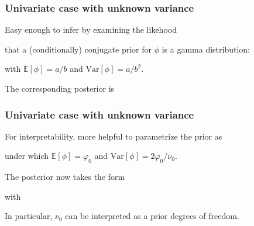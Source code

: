\documentclass[18pt]{beamer}
\newcommand{\defineTightItemizeSpacing}{%
	\setlength{\abovedisplayskip}{.25\baselineskip}%
	\setlength{\belowdisplayskip}{.25\baselineskip}%
}
\newenvironment{tightEquation*}{%
	\defineTightItemizeSpacing%
	\begin{equation*}
}{
	\end{equation*} \ignorespacesafterend
}
\newcommand{\given}{\thinnerspace | \thinnerspace}
\newcommand{\thinnerspace}{\mskip.5\thinmuskip}
\newcommand{\expectation}{\mathbb{E}}
\newcommand{\variance}{\mathrm{Var}}
\newcommand{\gammaDist}{\mathrm{Gamma}}
\newcommand{\density}{\pi}
\newcommand{\likelihood}{L}
\begin{document}
\begin{frame}
\frametitle{Univariate case with unknown variance}
\pause
Easy enough to infer by examining the likehood
\pause%
that a (conditionally) conjugate prior for $\phi$ is a gamma distribution:
with $\expectation[\phi] = a / b$ and $\variance[\phi] = a / b^2$.

\pause 
\smallskip
The corresponding posterior is
\end{frame}

\begin{frame}
\frametitle{Univariate case with unknown variance}
For interpretability, more helpful to parametrize the prior as 
under which $\expectation[\phi] = \varphi_0$ and $\variance[\phi] = 2 \varphi_0 / \nu_0$.

\medskip
The posterior now takes the form
with

\pause
\smallskip
In particular, $\nu_0$ can be interpreted as a prior degrees of freedom.
\end{frame}
\end{document}
